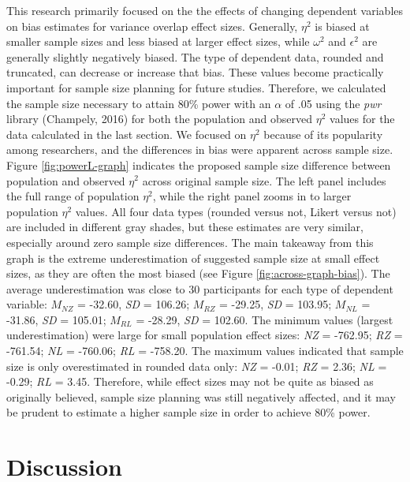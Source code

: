 \documentclass[english,man]{apa6}
\theoremstyle{definition}
\theoremstyle{definition}
\theoremstyle{definition}
\theoremstyle{remark}
\begin{document}
This research primarily focused on the the effects of changing dependent
variables on bias estimates for variance overlap effect sizes.
Generally, \(\eta^2\) is biased at smaller sample sizes and less biased
at larger effect sizes, while \(\omega^2\) and \(\epsilon^2\) are
generally slightly negatively biased. The type of dependent data,
rounded and truncated, can decrease or increase that bias. These values
become practically important for sample size planning for future
studies. Therefore, we calculated the sample size necessary to attain
80\% power with an \(\alpha\) of .05 using the \emph{pwr} library
(Champely, 2016) for both the population and observed \(\eta^2\) values
for the data calculated in the last section. We focused on \(\eta^2\)
because of its popularity among researchers, and the differences in bias
were apparent across sample size. Figure \ref{fig:powerL-graph}
indicates the proposed sample size difference between population and
observed \(\eta^2\) across original sample size. The left panel includes
the full range of population \(\eta^2\), while the right panel zooms in
to larger population \(\eta^2\) values. All four data types (rounded
versus not, Likert versus not) are included in different gray shades,
but these estimates are very similar, especially around zero sample size
differences. The main takeaway from this graph is the extreme
underestimation of suggested sample size at small effect sizes, as they
are often the most biased (see Figure \ref{fig:across-graph-bias}). The
average underestimation was close to 30 participants for each type of
dependent variable: \(M_{NZ}\) = -32.60, \emph{SD} = 106.26; \(M_{RZ}\)
= -29.25, \emph{SD} = 103.95; \(M_{NL}\) = -31.86, \emph{SD} = 105.01;
\(M_{RL}\) = -28.29, \emph{SD} = 102.60. The minimum values (largest
underestimation) were large for small population effect sizes: \emph{NZ}
= -762.95; \emph{RZ} = -761.54; \emph{NL} = -760.06; \emph{RL} =
-758.20. The maximum values indicated that sample size is only
overestimated in rounded data only: \emph{NZ} = -0.01; \emph{RZ} = 2.36;
\emph{NL} = -0.29; \emph{RL} = 3.45. Therefore, while effect sizes may
not be quite as biased as originally believed, sample size planning was
still negatively affected, and it may be prudent to estimate a higher
sample size in order to achieve 80\% power.

\section{Discussion}\label{discussion}
\end{document}
